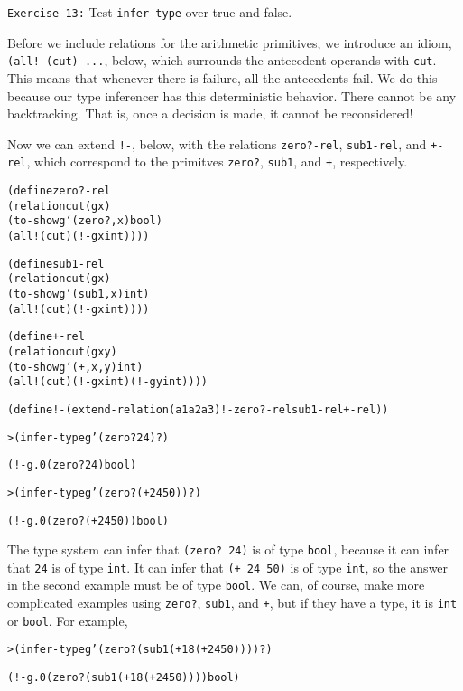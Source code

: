 \texttt{Exercise 13:} Test \texttt{infer-type} over true and false.

Before we include relations for the arithmetic primitives, we
introduce an idiom, \texttt{(all! (cut) ...}, below, which surrounds
the antecedent operands with \texttt{cut}.  This means that whenever
there is failure, all the antecedents fail.  We do this because our
type inferencer has this deterministic behavior.  There cannot be any
backtracking.  That is, once a decision is made, it cannot be
reconsidered!

Now we can extend \texttt{!-}, below, with the relations
\texttt{zero?-rel}, \texttt{sub1-rel}, and \texttt{+-rel}, which
correspond to the primitves \texttt{zero?}, \texttt{sub1}, and
\texttt{+}, respectively.

\begin{alltt}
(define zero?-rel
  (relation cut (g x)
    (to-show g `(zero? ,x) bool)
    (all! (cut) (!- g x int))))

(define sub1-rel
  (relation cut (g x)
    (to-show g `(sub1 ,x) int)
    (all! (cut) (!- g x int))))

(define +-rel
  (relation cut (g x y)
    (to-show g `(+ ,x ,y) int)
    (all! (cut) (!- g x int) (!- g y int))))
\end{alltt}

\begin{alltt}
(define !- (extend-relation (a1 a2 a3) !- zero?-rel sub1-rel +-rel))
\end{alltt}

\begin{alltt}
> (infer-type g '(zero? 24) ?)

(!- g.0 (zero? 24) bool)
\end{alltt}

\begin{alltt}
> (infer-type g '(zero? (+ 24 50)) ?)

(!- g.0 (zero? (+ 24 50)) bool)
\end{alltt}

The type system can infer that \texttt{(zero? 24)} is of type
\texttt{bool}, because it can infer that \texttt{24} is of type
\texttt{int}.  It can infer that \texttt{(+ 24 50)} is of type
\texttt{int}, so the answer in the second example must be of type
\texttt{bool}.  We can, of course, make more complicated examples
using \texttt{zero?}, \texttt{sub1}, and \texttt{+}, but if they have
a type, it is \texttt{int} or \texttt{bool}.  For example,

\begin{alltt}
> (infer-type g '(zero? (sub1 (+ 18 (+ 24 50)))) ?)

(!- g.0 (zero? (sub1 (+ 18 (+ 24 50)))) bool)
\end{alltt}

